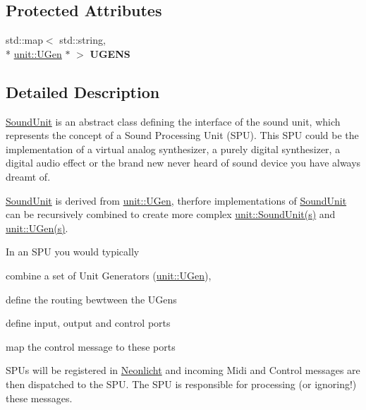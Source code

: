 \subsection*{Protected Attributes}
\begin{DoxyCompactItemize}
\item 
\hypertarget{classunit_1_1SoundUnit_a08f1485a5a06b0d458e99833f9207678}{std\-::map$<$ std\-::string, \\*
\hyperlink{classunit_1_1UGen}{unit\-::\-U\-Gen} $\ast$ $>$ {\bfseries U\-G\-E\-N\-S}}\label{classunit_1_1SoundUnit_a08f1485a5a06b0d458e99833f9207678}

\end{DoxyCompactItemize}


\subsection{Detailed Description}
\hyperlink{classunit_1_1SoundUnit}{Sound\-Unit} is an abstract class defining the interface of the sound unit, which represents the concept of a Sound Processing Unit (S\-P\-U). This S\-P\-U could be the implementation of a virtual analog synthesizer, a purely digital synthesizer, a digital audio effect or the brand new never heard of sound device you have always dreamt of.

\hyperlink{classunit_1_1SoundUnit}{Sound\-Unit} is derived from \hyperlink{classunit_1_1UGen}{unit\-::\-U\-Gen}, therfore implementations of \hyperlink{classunit_1_1SoundUnit}{Sound\-Unit} can be recursively combined to create more complex \hyperlink{classunit_1_1SoundUnit}{unit\-::\-Sound\-Unit(s)} and \hyperlink{classunit_1_1UGen}{unit\-::\-U\-Gen(s)}.

In an S\-P\-U you would typically


\begin{DoxyItemize}
\item combine a set of Unit Generators (\hyperlink{classunit_1_1UGen}{unit\-::\-U\-Gen}),
\item define the routing bewtween the U\-Gens
\item define input, output and control ports
\item map the control message to these ports
\end{DoxyItemize}

S\-P\-Us will be registered in \hyperlink{classNeonlicht}{Neonlicht} and incoming Midi and Control messages are then dispatched to the S\-P\-U. The S\-P\-U is responsible for processing (or ignoring!) these messages.


